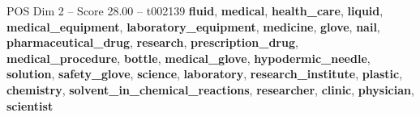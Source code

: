\begin{textsample}{POS Dim 2 – Score 28.00 – t002139}  \label{ex:f2_pos_028}
\textbf{fluid}, \textbf{medical}, \textbf{health\_care}, \textbf{liquid}, \textbf{medical\_equipment}, \textbf{laboratory\_equipment}, \textbf{medicine}, \textbf{glove}, \textbf{nail}, \textbf{pharmaceutical\_drug}, \textbf{research}, \textbf{prescription\_drug}, \textbf{medical\_procedure}, \textbf{bottle}, \textbf{medical\_glove}, \textbf{hypodermic\_needle}, \textbf{solution}, \textbf{safety\_glove}, \textbf{science}, \textbf{laboratory}, \textbf{research\_institute}, \textbf{plastic}, \textbf{chemistry}, \textbf{solvent\_in\_chemical\_reactions}, \textbf{researcher}, \textbf{clinic}, \textbf{physician}, \textbf{scientist}

\end{textsample}
